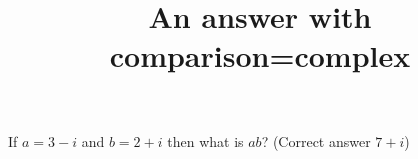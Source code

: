 \documentclass[hidesidemenu]{webquiz}
\title{An answer with comparison=complex}
\begin{document}
  \begin{question}     %
     If $a=3-i$ and $b=2+i$ then what is $ab$?
      (Correct answer $7+i$)
  \end{question}
\end{document}
